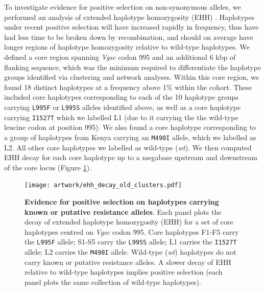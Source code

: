 \documentclass[a4paper,11pt,abstracton,hidelinks]{scrartcl}
\begin{document}
To investigate evidence for positive selection on non-synonymous alleles, we performed an analysis of extended haplotype homozygosity (EHH) \cite{Sabeti2002}.
%
Haplotypes under recent positive selection will have increased rapidly in frequency, thus have had less time to be broken down by recombination, and should on average have longer regions of haplotype homozygosity relative to wild-type haplotypes.
%
We defined a core region spanning \textit{Vgsc} codon 995 and an additional 6 kbp of flanking sequence, which was the minimum required to differentiate the haplotype groups identified via clustering and network analyses.
%
Within this core region, we found 18 distinct haplotypes at a frequency above 1\% within the cohort.
%
These included core haplotypes corresponding to each of the 10 haplotype groups carrying \texttt{L995F} or \texttt{L995S} alleles identified above, as well as a core haplotype carrying \texttt{I1527T} which we labelled L1 (due to it carrying the the wild-type leucine codon at position 995).
%
We also found a core haplotype corresponding to a group of haplotypes from Kenya carrying an \texttt{M490I} allele, which we labelled as L2.
%
All other core haplotypes we labelled as wild-type (\textit{wt}).
%
We then computed EHH decay for each core haplotype up to a megabase upstream and downstream of the core locus (Figure \ref{fig:ehh_decay}).
%


%
\begin{figure}[!t]
  \texttt{[image: artwork/ehh\_decay\_old\_clusters.pdf]}
  \caption{\textbf{Evidence for positive selection on haplotypes carrying known or putative resistance alleles}. Each panel plots the decay of extended haplotype homozygosity (EHH) for a set of core haplotypes centred on \textit{Vgsc} codon 995. Core haplotypes F1-F5 carry the \texttt{L995F} allele; S1-S5 carry the \texttt{L995S} allele; L1 carries the \texttt{I1527T} allele; L2 carries the \texttt{M490I} allele. Wild-type (\textit{wt}) haplotypes do not carry known or putative resistance alleles. A slower decay of EHH relative to wild-type haplotypes implies positive selection (each panel plots the same collection of wild-type haplotypes).}
  \label{fig:ehh_decay}
\end{figure}
\end{document}
